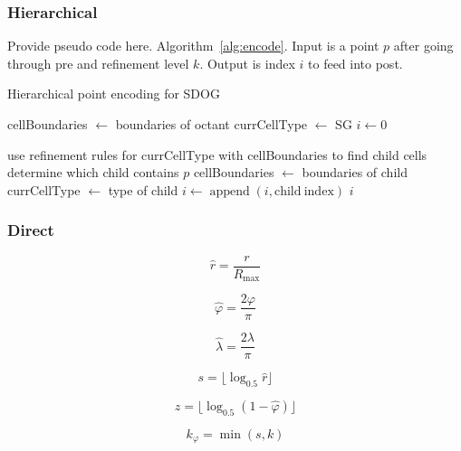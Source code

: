 \subsubsection{Hierarchical}
Provide pseudo code here. Algorithm~\ref{alg:encode}. Input is a point $p$ after going through pre and refinement level $k$. Output is index $i$ to feed into post.


\begin{algorithm}
	\caption{Hierarchical point encoding for SDOG}
	
	\begin{algorithmic}
		
		\STATE cellBoundaries $\leftarrow$ boundaries of octant
		\STATE currCellType $\leftarrow$ SG
		\STATE $i \leftarrow 0$
		
			\STATE use refinement rules for currCellType with cellBoundaries to find child cells
			\STATE determine which child contains $p$
			\STATE cellBoundaries $\leftarrow$ boundaries of child
			\STATE currCellType $\leftarrow$ type of child
			\STATE $i \leftarrow \operatorname{append}(i, \mathrm{child~index})$
		\ENDFOR
		\RETURN $i$
		 
	\end{algorithmic}
	\label{alg:encode}
\end{algorithm}


\subsubsection{Direct}

\begin{equation*}
\hat{r} = \frac{r}{R_\mathrm{max}}
\end{equation*}

\begin{equation*}
\hat{\varphi} = \frac{2 \varphi}{\pi}
\end{equation*}

\begin{equation*}
\hat{\lambda} = \frac{2 \lambda}{\pi}
\end{equation*}

\begin{equation*}
s = \lfloor \log_{0.5} \hat{r} \rfloor
\end{equation*}

\begin{equation*}
z = \lfloor \log_{0.5} ( 1 - \hat{\varphi} ) \rfloor
\end{equation*}

\begin{equation*}
k_\varphi = \min ( s, k )
\end{equation*}

